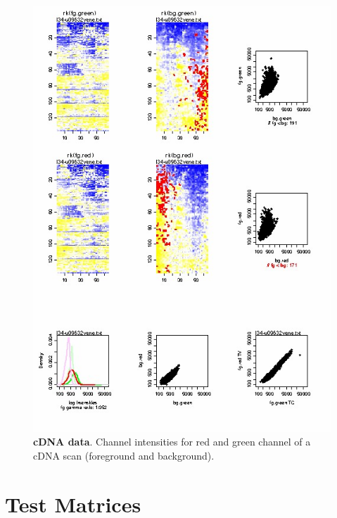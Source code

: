 \documentclass[nogin, dvips,12pt,a4paper,twoside]{amsart}
\begin{document}
\begin{figure}[htbp]
\begin{center}
\includegraphics[width=0.80\linewidth]{L34qcLegend}
\caption{\textbf{cDNA data}. Channel intensities for red and green channel of a cDNA scan (foreground and background).}\label{fig:L34qcLegend}
\end{center}
\end{figure}

\clearpage
{}
\pagebreak
\section{Test Matrices}
\end{document}
